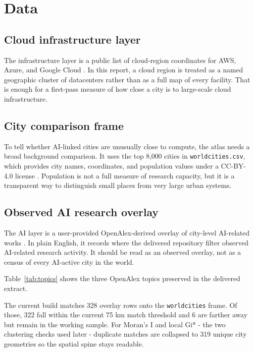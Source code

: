 \documentclass[11pt]{article}
\begin{document}
\section{Data}
\subsection{Cloud infrastructure layer}
The infrastructure layer is a public list of cloud-region coordinates for AWS, Azure, and Google Cloud \citep{cloudregions}. In this report, a cloud region is treated as a named geographic cluster of datacenters rather than as a full map of every facility. That is enough for a first-pass measure of how close a city is to large-scale cloud infrastructure.



\subsection{City comparison frame}
To tell whether AI-linked cities are unusually close to compute, the atlas needs a broad background comparison. It uses the top 8,000 cities in \texttt{worldcities.csv}, which provides city names, coordinates, and population values under a CC-BY-4.0 license \citep{worldcities}. Population is not a full measure of research capacity, but it is a transparent way to distinguish small places from very large urban systems.

\subsection{Observed AI research overlay}
The AI layer is a user-provided OpenAlex-derived overlay of city-level AI-related works \citep{openalex}. In plain English, it records where the delivered repository filter observed AI-related research activity. It should be read as an observed overlay, not as a census of every AI-active city in the world.

Table~\ref{tab:topics} shows the three OpenAlex topics preserved in the delivered extract.



The current build matches 328 overlay rows onto the \texttt{worldcities} frame. Of those, 322 fall within the current 75 km match threshold and 6 are farther away but remain in the working sample. For Moran's I and local Gi* - the two clustering checks used later - duplicate matches are collapsed to 319 unique city geometries so the spatial spine stays readable.
\end{document}
